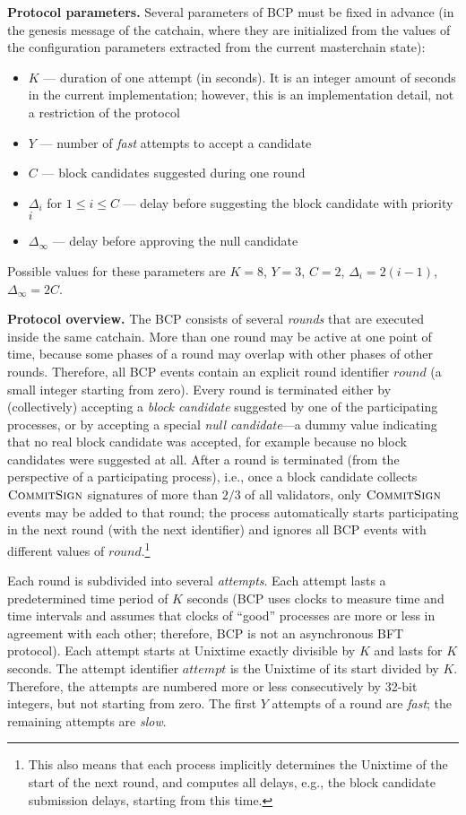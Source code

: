\documentclass[12pt,oneside]{article}
\def\makepoint#1{\medbreak\noindent{\bf #1.\ }}
\def\nxsubpoint{\refstepcounter{subsubsection}%
  \smallbreak\makepoint{\thesubsubsection}}
\def\emb#1{\textbf{#1.}}
\let\vr=\textit
\def\opsc#1{\operatorname{\textsc{#1}}}
\def\CommitSign{\opsc{CommitSign}}
\def\wround{\vr{round}}
\def\wattempt{\vr{attempt}}
\begin{document}
\nxsubpoint\emb{Protocol parameters}
Several parameters of BCP must be fixed in advance (in the genesis message of the catchain, where they are initialized from the values of the configuration parameters extracted from the current masterchain state):
\begin{itemize}
\item $K$ --- duration of one attempt (in seconds). It is an integer amount of seconds in the current implementation; however, this is an implementation detail, not a restriction of the protocol
\item $Y$ --- number of {\em fast\/} attempts to accept a candidate
\item $C$ --- block candidates suggested during one round
\item $\Delta_i$ for $1\leq i\leq C$ --- delay before suggesting the block candidate with priority $i$
\item $\Delta_\infty$ --- delay before approving the null candidate
\end{itemize}
Possible values for these parameters are $K=8$, $Y=3$, $C=2$, $\Delta_i=2(i-1)$, $\Delta_\infty=2C$.

\nxsubpoint\emb{Protocol overview}
The BCP consists of several {\em rounds\/} that are executed inside the same catchain. More than one round may be active at one point of time, because some phases of a round may overlap with other phases of other rounds. Therefore, all BCP events contain an explicit round identifier $\wround$ (a small integer starting from zero). Every round is terminated either by (collectively) accepting a {\em block candidate\/} suggested by one of the participating processes, or by accepting a special {\em null candidate\/}---a dummy value indicating that no real block candidate was accepted, for example because no block candidates were suggested at all. After a round is terminated (from the perspective of a participating process), i.e., once a block candidate collects $\CommitSign$ signatures of more than $2/3$ of all validators, only $\CommitSign$ events may be added to that round; the process automatically starts participating in the next round (with the next identifier) and ignores all BCP events with different values of $\wround$.\footnote{This also means that each process implicitly determines the Unixtime of the start of the next round, and computes all delays, e.g., the block candidate submission delays, starting from this time.}

Each round is subdivided into several {\em attempts}. Each attempt lasts a predetermined time period of $K$ seconds (BCP uses clocks to measure time and time intervals and assumes that clocks of ``good'' processes are more or less in agreement with each other; therefore, BCP is not an asynchronous BFT protocol). Each attempt starts at Unixtime exactly divisible by $K$ and lasts for $K$ seconds. The attempt identifier $\wattempt$ is the Unixtime of its start divided by $K$. Therefore, the attempts are numbered more or less consecutively by 32-bit integers, but not starting from zero. The first $Y$ attempts of a round are {\em fast\/}; the remaining attempts are {\em slow}.
\end{document}
